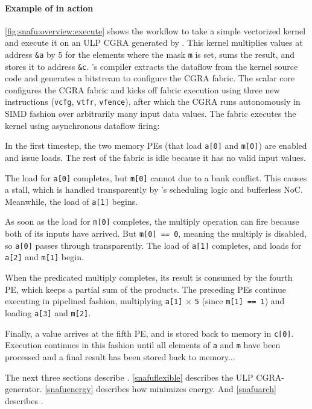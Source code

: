 \paragraph{Example of \snafu in action}
\autoref{fig:snafu:overview:execute} shows the workflow to take a simple vectorized kernel and execute it on an ULP CGRA generated by \snafuframe.
%
This kernel multiplies values at address {\tt \&a} by 5 for the elements where the mask {\tt m} is set,
  sums the result, and stores it to address {\tt \&c}.
% 
\snafuframe's compiler extracts the dataflow from the kernel source code and generates a bitstream to configure the CGRA fabric.
%
The scalar core configures the CGRA fabric and kicks off fabric execution using three new instructions ({\tt vcfg}, {\tt vtfr}, {\tt vfence}),
after which the CGRA runs autonomously in SIMD fashion over arbitrarily many input data values.
% 
The fabric executes the kernel using asynchronous dataflow firing:
\begin{compactitem}
\item[\circled{1}]
In the first timestep, the two memory PEs (that load {\tt a[0]} and {\tt m[0]}) are enabled and issue loads.
%
The rest of the fabric is idle because it has no valid input values.
\item[\circled{2}]
The load for {\tt a[0]} completes, but {\tt m[0]} cannot due to a bank conflict.
%
This causes a stall, which is handled transparently by \snafuframe's scheduling logic and bufferless NoC.
%
Meanwhile, the load of {\tt a[1]} begins.
%
\item[\circled{3}]
% 
As soon as the load for {\tt m[0]} completes, the multiply operation can fire because both of its inputs have arrived.
% 
But {\tt m[0] == 0}, meaning the multiply is disabled, so {\tt a[0]} passes through transparently.
%
The load of {\tt a[1]} completes, and loads for {\tt a[2]} and {\tt m[1]} begin.
%
\item[\circled{4}]
%
When the predicated multiply completes, its result is consumed by the fourth PE, which keeps a partial sum of the products.
%
The preceding PEs continue executing in pipelined fashion,
multiplying {\tt a[1]} $\times$ {\tt 5} (since {\tt m[1] == 1}) and loading {\tt a[3]} and {\tt m[2]}.
%
\item[\circled{5}]
%
Finally, a value arrives at the fifth PE, and is stored back to memory in {\tt c[0]}.
%
Execution continues in this fashion until all elements of {\tt a} and {\tt m} have been processed and a final result has been stored back to memory...
\end{compactitem}

\noindent
The next three sections describe \snafuframe.
% 
\autoref{snafuflexible} describes the \snafuframe ULP CGRA-generator.
% 
\autoref{snafuenergy} describes how \snafuframe minimizes energy.
% 
And \autoref{snafuarch} describes \snafuarch.

